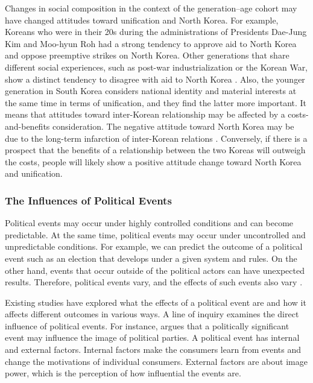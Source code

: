 \documentclass[letterpaper,9pt,twocolumn,twoside,]{pinp}
\begin{document}
Changes in social composition in the context of the generation--age
cohort may have changed attitudes toward unification and North Korea.
For example, Koreans who were in their 20s during the administrations of
Presidents Dae-Jung Kim and Moo-hyun Roh had a strong tendency to
approve aid to North Korea and oppose preemptive strikes on North Korea.
Other generations that share different social experiences, such as
post-war industrialization or the Korean War, show a distinct tendency
to disagree with aid to North Korea \citep{Chang2018}. Also, the younger
generation in South Korea considers national identity and material
interests at the same time in terms of unification, and they find the
latter more important. It means that attitudes toward inter-Korean
relationship may be affected by a costs-and-benefits consideration. The
negative attitude toward North Korea may be due to the long-term
infarction of inter-Korean relations \citep{ChoHan2014}. Conversely, if
there is a prospect that the benefits of a relationship between the two
Koreas will outweigh the costs, people will likely show a positive
attitude change toward North Korea and unification.

\hypertarget{the-influences-of-political-events}{%
\subsubsection{The Influences of Political
Events}\label{the-influences-of-political-events}}

Political events may occur under highly controlled conditions and can
become predictable. At the same time, political events may occur under
uncontrolled and unpredictable conditions. For example, we can predict
the outcome of a political event such as an election that develops under
a given system and rules. On the other hand, events that occur outside
of the political actors can have unexpected results. Therefore,
political events vary, and the effects of such events also vary
\citep{Smith2005}.

Existing studies have explored what the effects of a political event are
and how it affects different outcomes in various ways. A line of inquiry
examines the direct influence of political events. For instance,
\citet{Smith2005} argues that a politically significant event may
influence the image of political parties. A political event has internal
and external factors. Internal factors make the consumers learn from
events and change the motivations of individual consumers. External
factors are about image power, which is the perception of how
influential the events are.
\end{document}
